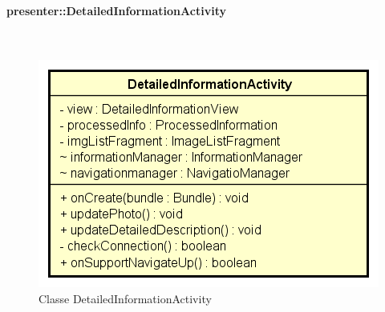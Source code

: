 \documentclass[../DefinizioneDiProdotto.tex]{subfiles}
\begin{document}
\paragraph{presenter::DetailedInformationActivity}
\
\begin{figure}[H]
	\centering
	\includegraphics[width=\maxwidth]{img/DetailedInformationActivity.png}
	\caption{Classe DetailedInformationActivity}\label{fig:presenter::DetailedInformationActivity} 
\end{figure}
\end{document}
